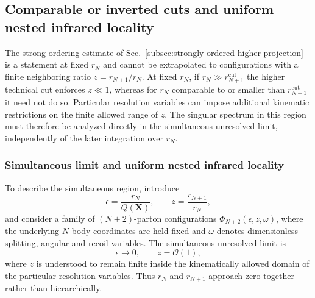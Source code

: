 \documentclass[11pt]{article}
\newcommand{\rn}{r_N}
\newcommand{\rnp}{r_{N+1}}
\newcommand{\cut}{\mathrm{cut}}
\newcommand{\Ph}{\Phi}
\begin{document}
\subsection{Comparable or inverted cuts and uniform nested infrared locality}
\label{subsec:uniform-nested-locality}

The strong-ordering estimate of Sec.~\ref{subsec:strongly-ordered-higher-projection} is a statement at
fixed $\rn$ and cannot be extrapolated to configurations with a finite neighboring ratio
$z=\rnp/\rn$.  At fixed $\rn$, if $\rn\gg\rnp^{\cut}$ the higher technical cut enforces
$z\ll1$, whereas for $\rn$ comparable to or smaller than $\rnp^{\cut}$ it need not do so.  Particular
resolution variables can impose additional kinematic restrictions on the finite allowed range of $z$.
The singular spectrum in this region must therefore be analyzed directly in the simultaneous unresolved
limit, independently of the later integration over $\rn$.

\subsubsection{Simultaneous limit and uniform nested infrared locality}

To describe the simultaneous region, introduce
\begin{equation}
\epsilon=\frac{\rn}{Q(\mathbf X)},
\qquad
z=\frac{\rnp}{\rn},
\label{eq:epsilon-z-def}
\end{equation}
and consider a family of \((N+2)\)-parton configurations
\(\Ph_{N+2}(\epsilon,z,\omega)\), where the underlying \(N\)-body coordinates are held fixed and
\(\omega\) denotes dimensionless splitting, angular and recoil variables. The simultaneous unresolved
limit is
\begin{equation}
\epsilon\to0,
\qquad
z=\mathcal O(1),
\label{eq:simultaneous-unresolved}
\end{equation}
where \(z\) is understood to remain finite inside the kinematically allowed domain of the particular
resolution variables. Thus \(\rn\) and \(\rnp\) approach zero together rather than hierarchically.
\end{document}
